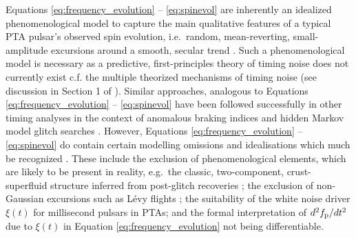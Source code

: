 \documentclass[fleqn,usenatbib,useAMS]{mnras}
\begin{document}
Equations \eqref{eq:frequency_evolution} -- \eqref{eq:spinevol} are inherently an idealized phenomenological model to capture the main qualitative features of a typical PTA pulsar's observed spin evolution, i.e.\ random, mean-reverting, small-amplitude excursions around a smooth, secular trend \citep{NANOgrav2023,EPTA2023,Zic2023arXiv230616230Z}. Such a phenomenological model is necessary as a predictive, first-principles theory of timing noise does not currently exist c.f. the multiple theorized mechanisms of timing noise (see discussion in Section 1 of \cite{KimpsonPTA}). Similar approaches, analogous to Equations \eqref{eq:frequency_evolution} -- \eqref{eq:spinevol} have been followed successfully in other timing analyses in the context of anomalous braking indices \citep{Vargas} and hidden Markov model glitch searches \citep{Melatos2020ApJ...896...78M,Lower2021MNRAS.508.3251L,Dunn2022,Dunn2023MNRAS.522.5469D}. However, Equations \eqref{eq:frequency_evolution} -- \eqref{eq:spinevol} do contain certain modelling omissions and idealisations which much be recognized \citep{Meyers2021,Myers2021MNRAS.502.3113M,Vargas}. These include the exclusion of phenomenological elements, which are likely to be present in reality, e.g.\ the classic, two-component, crust-superfluid structure inferred from post-glitch recoveries \citep{Baym1969,vanEysden,Alpar2017MNRAS.471.4827G,Myers2021MNRAS.502.3113M,Meyers2021}; the exclusion of non-Gaussian excursions such as L\'{e}vy flights \citep{Sornette2004}; the suitability of the white noise driver $\xi(t)$ for millisecond pulsars in PTAs; and the formal interpretation of $d^2 f_{\rm p} / dt^2$ due to $\xi(t)$ in Equation \eqref{eq:frequency_evolution} not being differentiable.
\end{document}
